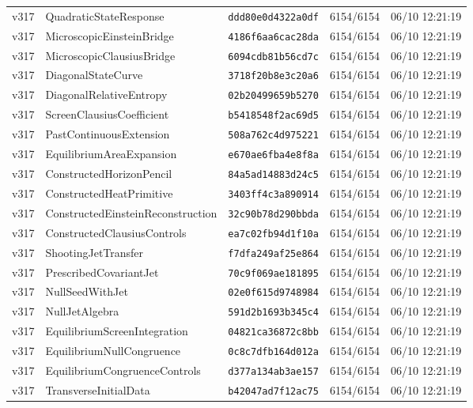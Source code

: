 \documentclass[11pt]{article}
\theoremstyle{definition}\newtheorem{deriv}{Derivation}
\begin{document}
{\begin{longtable}{@{}lllll@{}}
v317 & QuadraticStateResponse & \texttt{ddd80e0d4322a0df} & 6154/6154 & 06/10 12:21:19 \\
v317 & MicroscopicEinsteinBridge & \texttt{4186f6aa6cac28da} & 6154/6154 & 06/10 12:21:19 \\
v317 & MicroscopicClausiusBridge & \texttt{6094cdb81b56cd7c} & 6154/6154 & 06/10 12:21:19 \\
v317 & DiagonalStateCurve & \texttt{3718f20b8e3c20a6} & 6154/6154 & 06/10 12:21:19 \\
v317 & DiagonalRelativeEntropy & \texttt{02b20499659b5270} & 6154/6154 & 06/10 12:21:19 \\
v317 & ScreenClausiusCoefficient & \texttt{b5418548f2ac69d5} & 6154/6154 & 06/10 12:21:19 \\
v317 & PastContinuousExtension & \texttt{508a762c4d975221} & 6154/6154 & 06/10 12:21:19 \\
v317 & EquilibriumAreaExpansion & \texttt{e670ae6fba4e8f8a} & 6154/6154 & 06/10 12:21:19 \\
v317 & ConstructedHorizonPencil & \texttt{84a5ad14883d24c5} & 6154/6154 & 06/10 12:21:19 \\
v317 & ConstructedHeatPrimitive & \texttt{3403ff4c3a890914} & 6154/6154 & 06/10 12:21:19 \\
v317 & ConstructedEinsteinReconstruction & \texttt{32c90b78d290bbda} & 6154/6154 & 06/10 12:21:19 \\
v317 & ConstructedClausiusControls & \texttt{ea7c02fb94d1f10a} & 6154/6154 & 06/10 12:21:19 \\
v317 & ShootingJetTransfer & \texttt{f7dfa249af25e864} & 6154/6154 & 06/10 12:21:19 \\
v317 & PrescribedCovariantJet & \texttt{70c9f069ae181895} & 6154/6154 & 06/10 12:21:19 \\
v317 & NullSeedWithJet & \texttt{02e0f615d9748984} & 6154/6154 & 06/10 12:21:19 \\
v317 & NullJetAlgebra & \texttt{591d2b1693b345c4} & 6154/6154 & 06/10 12:21:19 \\
v317 & EquilibriumScreenIntegration & \texttt{04821ca36872c8bb} & 6154/6154 & 06/10 12:21:19 \\
v317 & EquilibriumNullCongruence & \texttt{0c8c7dfb164d012a} & 6154/6154 & 06/10 12:21:19 \\
v317 & EquilibriumCongruenceControls & \texttt{d377a134ab3ae157} & 6154/6154 & 06/10 12:21:19 \\
v317 & TransverseInitialData & \texttt{b42047ad7f12ac75} & 6154/6154 & 06/10 12:21:19 \\

\end{longtable}}
\end{document}
